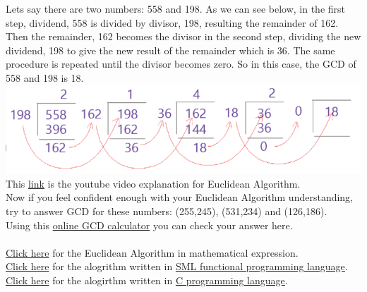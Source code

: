 \documentclass{article}
\begin{document}
Lets say there are two numbers: 558 and 198. As we can see below, in the first step, dividend, 558 is divided by divisor, 198, resulting the remainder of 162. Then the remainder, 162 becomes the divisor in the second step, dividing the new dividend, 198 to give the new result of the remainder which is 36. The same procedure is repeated until the divisor becomes zero. So in this case, the GCD of 558 and 198 is 18. \\
\includegraphics[scale=0.5]{gcd.PNG}\\
This \href{https://goo.gl/Lj5I2M}{link} is the youtube video explanation for Euclidean Algorithm.\\
Now if you feel confident enough with your Euclidean Algorithm understanding, try to answer GCD for these numbers: (255,245), (531,234) and (126,186).\\ 
Using this \href{https://goo.gl/neHGSK}{online GCD calculator} you can check your answer here.\\
\smallskip\\
\hyperlink{p2}{Click here} for the Euclidean Algorithm in mathematical expression.\\
\hyperlink{p3}{Click here} for the alogrithm written in \href{https://goo.gl/H5hWaQ}{SML functional programming language}.\\
\hyperlink{p4}{Click here} for the alogirthm written in \href{https://goo.gl/PqXN2H}{C programming language}.\\
\clearpage
\end{document}
